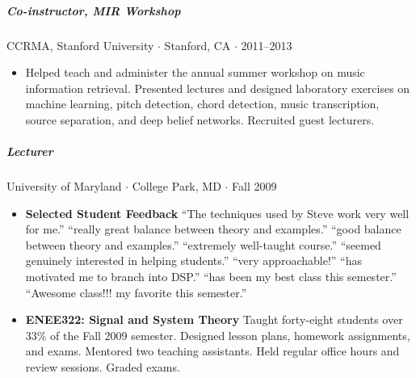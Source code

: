 \documentclass[10pt,letterpaper]{article}
\begin{document}
\subparagraph{Co-instructor, MIR Workshop} CCRMA, Stanford University $\cdot$ Stanford, CA $\cdot$ 2011--2013
\begin{itemize}
\item Helped teach and administer the annual summer workshop on music information retrieval.  Presented lectures and designed laboratory exercises on machine learning, pitch detection, chord detection, music transcription, source separation, and deep belief networks. Recruited guest lecturers.
\end{itemize}

\subparagraph{Lecturer} University of Maryland $\cdot$ College Park, MD $\cdot$ Fall 2009
\begin{itemize}
\item \textbf{Selected Student Feedback}  ``The techniques used by Steve work very well for me.'' ``really great balance between theory and examples.'' ``good balance between theory and examples.'' ``extremely well-taught course.'' ``seemed genuinely interested in helping students.'' ``very approachable!'' ``has motivated me to branch into DSP.'' ``has been my best class this semester.'' ``Awesome class!!! my favorite this semester.''
\item \textbf{ENEE322: Signal and System Theory} Taught forty-eight students over 33\% of the Fall 2009 semester. Designed lesson plans, homework assignments, and exams. Mentored two teaching assistants. Held regular office hours and review sessions. Graded exams.
\end{itemize}
\end{document}
